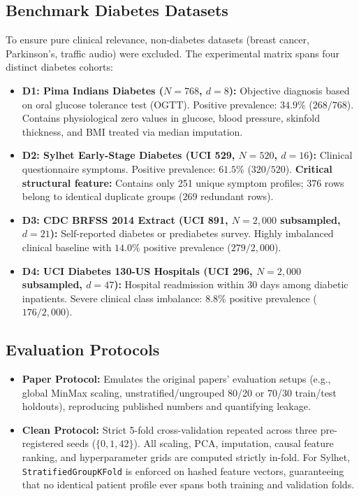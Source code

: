 \documentclass[11pt,a4paper]{article}
\begin{document}
\subsection{Benchmark Diabetes Datasets}
To ensure pure clinical relevance, non-diabetes datasets (breast cancer, Parkinson's, traffic audio) were excluded. The experimental matrix spans four distinct diabetes cohorts:
\begin{itemize}[leftmargin=1.5em]
    \item \textbf{D1: Pima Indians Diabetes ($N=768$, $d=8$):} Objective diagnosis based on oral glucose tolerance test (OGTT). Positive prevalence: $34.9\%$ ($268/768$). Contains physiological zero values in glucose, blood pressure, skinfold thickness, and BMI treated via median imputation.
    \item \textbf{D2: Sylhet Early-Stage Diabetes (UCI 529, $N=520$, $d=16$):} Clinical questionnaire symptoms. Positive prevalence: $61.5\%$ ($320/520$). \textbf{Critical structural feature:} Contains only 251 unique symptom profiles; 376 rows belong to identical duplicate groups ($269$ redundant rows).
    \item \textbf{D3: CDC BRFSS 2014 Extract (UCI 891, $N=2{,}000$ subsampled, $d=21$):} Self-reported diabetes or prediabetes survey. Highly imbalanced clinical baseline with $14.0\%$ positive prevalence ($279/2{,}000$).
    \item \textbf{D4: UCI Diabetes 130-US Hospitals (UCI 296, $N=2{,}000$ subsampled, $d=47$):} Hospital readmission within 30 days among diabetic inpatients. Severe clinical class imbalance: $8.8\%$ positive prevalence ($176/2{,}000$).
\end{itemize}

\subsection{Evaluation Protocols}
\begin{itemize}[leftmargin=1.5em]
    \item \textbf{Paper Protocol:} Emulates the original papers' evaluation setups (e.g., global MinMax scaling, unstratified/ungrouped 80/20 or 70/30 train/test holdouts), reproducing published numbers and quantifying leakage.
    \item \textbf{Clean Protocol:} Strict 5-fold cross-validation repeated across three pre-registered seeds ($\{0, 1, 42\}$). All scaling, PCA, imputation, causal feature ranking, and hyperparameter grids are computed strictly in-fold. For Sylhet, \texttt{StratifiedGroupKFold} is enforced on hashed feature vectors, guaranteeing that no identical patient profile ever spans both training and validation folds.
\end{itemize}
\end{document}
